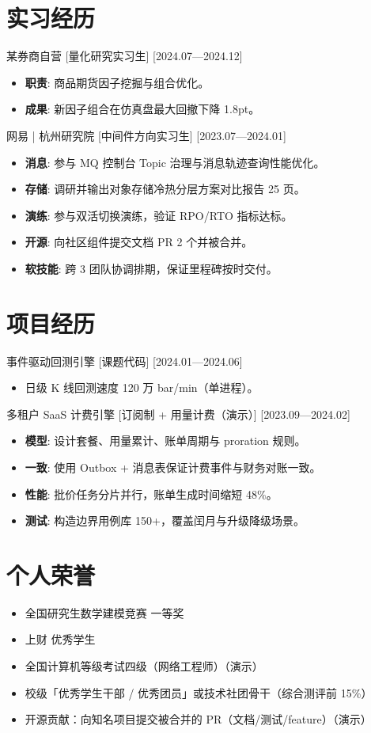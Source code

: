 \documentclass{resume-photo}
\begin{document}
\section{实习经历}
\ResumeItem
{某券商自营}
[\textnormal{量化研究实习生}]
[2024.07—2024.12]

\begin{itemize}
  \item \textbf{职责}: 商品期货因子挖掘与组合优化。
  \item \textbf{成果}: 新因子组合在仿真盘最大回撤下降 1.8pt。
\end{itemize}


\ResumeItem
{网易 | 杭州研究院}
[\textnormal{中间件方向实习生}]
[2023.07—2024.01]

\begin{itemize}
  \item \textbf{消息}: 参与 MQ 控制台 Topic 治理与消息轨迹查询性能优化。
  \item \textbf{存储}: 调研并输出对象存储冷热分层方案对比报告 25 页。
  \item \textbf{演练}: 参与双活切换演练，验证 RPO/RTO 指标达标。
  \item \textbf{开源}: 向社区组件提交文档 PR 2 个并被合并。
  \item \textbf{软技能}: 跨 3 团队协调排期，保证里程碑按时交付。
\end{itemize}



\section{项目经历}
\ResumeItem
{事件驱动回测引擎}
[\textnormal{课题代码}]
[2024.01—2024.06]

\begin{itemize}
  \item 日级 K 线回测速度 120 万 bar/min（单进程）。
\end{itemize}


\ResumeItem
{多租户 SaaS 计费引擎}
[\textnormal{订阅制 + 用量计费（演示）}]
[2023.09—2024.02]

\begin{itemize}
  \item \textbf{模型}: 设计套餐、用量累计、账单周期与 proration 规则。
  \item \textbf{一致}: 使用 Outbox + 消息表保证计费事件与财务对账一致。
  \item \textbf{性能}: 批价任务分片并行，账单生成时间缩短 48\%。
  \item \textbf{测试}: 构造边界用例库 150+，覆盖闰月与升级降级场景。
\end{itemize}



\section{个人荣誉}
\begin{itemize}
  \item 全国研究生数学建模竞赛 一等奖
  \item 上财 优秀学生
  \item 全国计算机等级考试四级（网络工程师）（演示）
  \item 校级「优秀学生干部 / 优秀团员」或技术社团骨干（综合测评前 15\%）
  \item 开源贡献：向知名项目提交被合并的 PR（文档/测试/feature）（演示）
\end{itemize}
\end{document}
